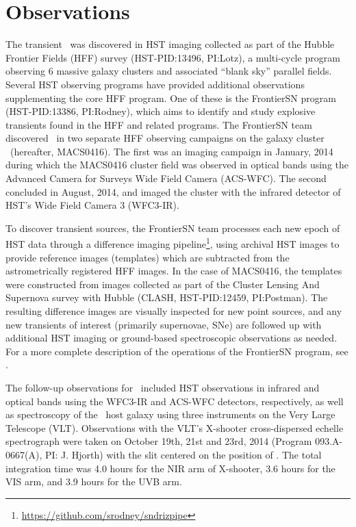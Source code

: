 \section{Observations}\label{sec:Observations}

The transient \spock\ was discovered in HST imaging collected as part
of the Hubble Frontier Fields (HFF) survey (HST-PID:13496, PI:Lotz), a
multi-cycle program observing 6 massive galaxy clusters and associated
``blank sky'' parallel fields.  Several HST observing programs have
provided additional observations supplementing the core HFF program.
One of these is the FrontierSN program (HST-PID:13386, PI:Rodney),
which aims to identify and study explosive transients found in the HFF
and related programs.  The FrontierSN team discovered \spock\ in two
separate HFF observing campaigns on the galaxy cluster
\ (hereafter, MACS0416).  The first was an imaging campaign
in January, 2014 during which the MACS0416 cluster field was observed
in optical bands using the Advanced Camera for Surveys Wide Field
Camera (ACS-WFC).  The second concluded in August, 2014, and imaged
the cluster with the infrared detector of HST's Wide Field Camera 3
(WFC3-IR).

To discover transient sources, the FrontierSN team processes each new
epoch of HST data through a difference imaging
pipeline\footnote{\url{https://github.com/srodney/sndrizpipe}}, using
archival HST images to provide reference images (templates) which are
subtracted from the astrometrically registered HFF images. In the case
of MACS0416, the templates were constructed from images collected as
part of the Cluster Lensing And Supernova survey with Hubble (CLASH,
HST-PID:12459, PI:Postman). The resulting difference images are
visually inspected for new point sources, and any new transients of
interest (primarily supernovae, SNe) are followed up with additional
HST imaging or ground-based spectroscopic observations as needed.  For
a more complete description of the operations of the FrontierSN
program, see \citet{Rodney:2015a}.

The follow-up observations for \spock\ included HST observations in
infrared and optical bands using the WFC3-IR and ACS-WFC detectors,
respectively, as well as spectroscopy of the \spock\ host galaxy using
three instruments on the Very Large Telescope (VLT).   Observations with the VLT's
X-shooter cross-dispersed echelle spectrograph \citep{Vernet:2011}
were taken on October 19th, 21st and 23rd, 2014 (Program
093.A-0667(A), PI: J. Hjorth) with the slit centered on the position
of .  The total integration time was 4.0 hours for the NIR arm
of X-shooter, 3.6 hours for the VIS arm, and 3.9 hours for the UVB
arm.  

